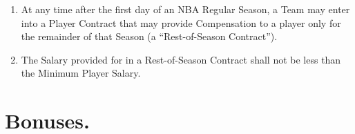 \documentclass[
]{book}
\providecommand{\tightlist}{%
  \setlength{\itemsep}{0pt}\setlength{\parskip}{0pt}}
\begin{document}
\begin{enumerate}
\def\labelenumi{(\alph{enumi})}
\tightlist
\item
  At any time after the first day of an NBA Regular Season, a Team may enter into a Player Contract that may provide Compensation to a player only for the remainder of that Season (a ``Rest-of-Season Contract'').
\item
  The Salary provided for in a Rest-of-Season Contract shall not be less than the Minimum Player Salary.
\end{enumerate}

\hypertarget{bonuses.}{%
\section{Bonuses.}\label{bonuses.}}
\end{document}
